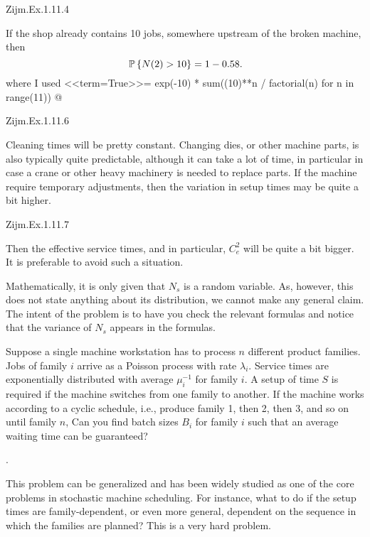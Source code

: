 \begin{question}
Zijm.Ex.1.11.4

 \begin{solution}
If the shop already contains 10 jobs, somewhere upstream of the broken machine, then 
   \begin{equation*}
     \P{N(2) > 10} = 1- 0.58.
   \end{equation*}
where  I used
<<term=True>>=
exp(-10) * sum((10)**n / factorial(n) for n in range(11))
@
\end{solution}
\end{question}

\begin{question}
Zijm.Ex.1.11.6
 \begin{solution}
   Cleaning times will be pretty constant. Changing dies, or other
   machine parts, is also typically quite predictable, although it can
   take a lot of time, in particular in case a crane or other heavy
   machinery is needed to replace parts. If the machine require
   temporary adjustments, then the variation in setup times may be
   quite a bit higher.
\end{solution}
\end{question}

\begin{question}
Zijm.Ex.1.11.7
 \begin{solution}
   Then the effective service times, and in particular, $C_e^2$ will
   be quite a bit bigger. It is preferable to avoid such a situation. 

   Mathematically, it is only given that $N_s$ is a random
   variable. As, however, this does not state anything about its
   distribution, we cannot make any general claim. The intent of the
   problem is to have you check the relevant formulas and notice that
   the variance of $N_s$ appears in the formulas.
\end{solution}
\end{question}

\begin{question}[use=false]
  Suppose a single machine workstation has to process $n$ different
  product families. Jobs of family $i$ arrive as a Poisson process
  with rate $\lambda_i$.  Service times are exponentially distributed
  with average $\mu_i^{-1}$ for family $i$. A setup of time $S$ is
  required if the machine switches from one family to another. If the
  machine works according to a cyclic schedule, i.e., produce family
  1, then 2, then 3, and so on until family $n$, Can you find batch
  sizes $B_i$ for family $i$ such that an average waiting time can be
  guaranteed?
  \begin{solution}
    \TBD. 

    This problem can be generalized and has been widely studied as one
    of the core problems in stochastic machine scheduling. For
    instance, what to do if the setup times are family-dependent, or
    even more general, dependent on the sequence in which the families
    are planned? This is a very hard problem. 
  \end{solution}
\end{question}

